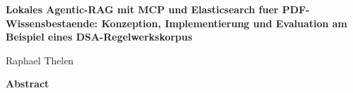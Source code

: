 \begin{titlepage}
\thispagestyle{empty}
\centering
\vspace*{2.5cm}
{\LARGE\bfseries Lokales Agentic-RAG mit MCP und Elasticsearch fuer PDF-Wissensbestaende: Konzeption, Implementierung und Evaluation am Beispiel eines DSA-Regelwerkskorpus\par}
\vspace{1.5cm}
{\Large Raphael Thelen\par}
\vspace{2cm}
\begin{minipage}{0.88\textwidth}
\raggedright
\textbf{Abstract}\par
\end{minipage}
\vfill
\end{titlepage}

\tableofcontents
\clearpage
{}

